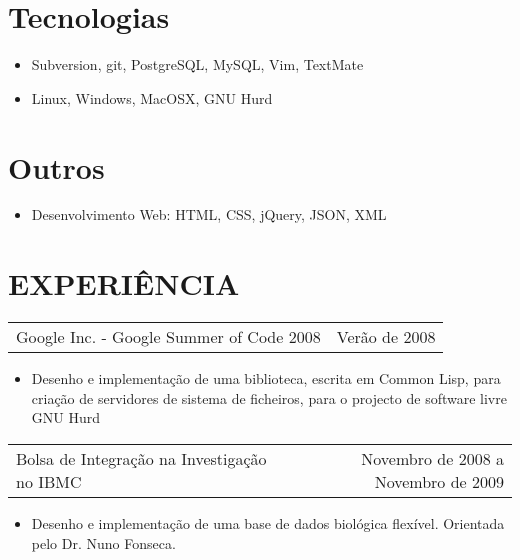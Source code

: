\documentclass[margin]{res}
\begin{document}
\begin{resume}
\normalsize{\section{Tecnologias}} 
                 \begin{itemize}
                  \item Subversion, git, PostgreSQL, MySQL, Vim, TextMate
                  \item Linux, Windows, MacOSX, GNU Hurd
                  \end{itemize}
                  
\normalsize{\section{Outros}} 
              \begin{itemize}
                \item Desenvolvimento Web: HTML, CSS, jQuery, JSON, XML
              \end{itemize}
 
\section{EXPERIÊNCIA}
            
                  \begin{tabular}{p{3in} r}
                  Google Inc. - Google Summer of Code 2008 & Verão de 2008
                  \end{tabular}	
                   \begin{itemize} %
                    \item[]  Desenho e implementação de uma biblioteca, escrita em Common Lisp, para criação de servidores
                     de sistema de ficheiros, para o projecto de software livre GNU Hurd 
		   \end{itemize} 
		   
		 \begin{tabular}{p{3in} r}
                  Bolsa de Integração na Investigação no IBMC &  Novembro de 2008 a Novembro de 2009 
                 \end{tabular}
		  \begin{itemize}
                   \item[] Desenho e implementação de uma base de dados biológica flexível. Orientada pelo Dr. Nuno Fonseca.
                  \end{itemize}
                  

\end{resume}
\end{document}
